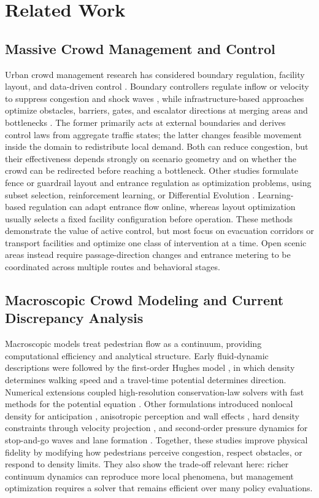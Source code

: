 \documentclass[lettersize,journal]{IEEEtran}
\begin{document}
\section{Related Work}
\label{sec:related}

\subsection{Massive Crowd Management and Control}

Urban crowd management research has considered boundary regulation, facility layout, and data-driven control \cite{RN2000,RN2193}.
Boundary controllers regulate inflow or velocity to suppress congestion and shock waves \cite{RN279,RN280,RN286}, while infrastructure-based approaches optimize obstacles, barriers, gates, and escalator directions at merging areas and bottlenecks \cite{RN1662,RN2118,RN2120}.
The former primarily acts at external boundaries and derives control laws from aggregate traffic states; the latter changes feasible movement inside the domain to redistribute local demand.
Both can reduce congestion, but their effectiveness depends strongly on scenario geometry and on whether the crowd can be redirected before reaching a bottleneck.
Other studies formulate fence or guardrail layout and entrance regulation as optimization problems, using subset selection, reinforcement learning, or Differential Evolution \cite{RN2121,RN2122,RN2123}.
Learning-based regulation can adapt entrance flow online, whereas layout optimization usually selects a fixed facility configuration before operation.
These methods demonstrate the value of active control, but most focus on evacuation corridors or transport facilities and optimize one class of intervention at a time.
Open scenic areas instead require passage-direction changes and entrance metering to be coordinated across multiple routes and behavioral stages.

\subsection{Macroscopic Crowd Modeling and Current Discrepancy Analysis}

Macroscopic models treat pedestrian flow as a continuum, providing computational efficiency and analytical structure.
Early fluid-dynamic descriptions \cite{RN282} were followed by the first-order Hughes model \cite{hughes2003}, in which density determines walking speed and a travel-time potential determines direction.
Numerical extensions coupled high-resolution conservation-law solvers with fast methods for the potential equation \cite{RN2078}.
Other formulations introduced nonlocal density for anticipation \cite{RN2097}, anisotropic perception and wall effects \cite{RN2080}, hard density constraints through velocity projection \cite{RN2099}, and second-order pressure dynamics for stop-and-go waves and lane formation \cite{RN2104}.
Together, these studies improve physical fidelity by modifying how pedestrians perceive congestion, respect obstacles, or respond to density limits.
They also show the trade-off relevant here: richer continuum dynamics can reproduce more local phenomena, but management optimization requires a solver that remains efficient over many policy evaluations.
\end{document}
